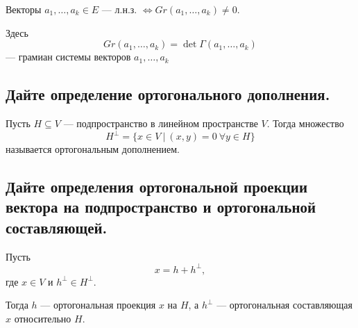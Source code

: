 \begin{theorem}
    Векторы $a_1, \ldots, a_k \in E$ --- л.н.з.
    $\Longleftrightarrow Gr(a_1, \ldots, a_k) \neq 0.$
\end{theorem}

\begin{remark}
    Здесь
    \[
        Gr(a_1, \ldots, a_k) = \det \Gamma(a_1, \ldots, a_k)
    \]
    --- грамиан системы векторов $a_1, \ldots, a_k$

\end{remark}

\subsection{Дайте определение ортогонального дополнения.}
\begin{definition}
    Пусть $H \subseteq V$ --- подпространство в линейном пространстве $V$.
    Тогда множество
    \[
        H^{\perp} = \{x \in V\ |\ (x, y) = 0\ \forall y \in H\}
    \]
    называется ортогональным дополнением.
\end{definition}

\subsection{Дайте определения ортогональной проекции вектора на подпространство и ортогональной составляющей.}

\begin{definition}
    Пусть
    \[
        x = h + h^{\perp},
    \]
    где $x \in V$ и $h^{\perp} \in H^{\perp}$.
    
    Тогда $h$ --- ортогональная проекция $x$ на $H$, а $h^{\perp}$ --- ортогональная составляющая $x$ относительно $H$.
\end{definition}

